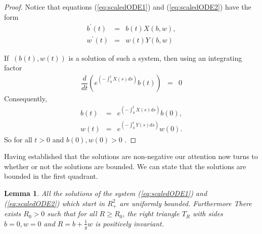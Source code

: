 \documentclass[review,authoryear]{elsarticle}
\newtheorem{lemma}[theorem]{Lemma}
\begin{document}
\begin{proof}
  Notice that equations (\ref{eq:scaledODE1}) and
  (\ref{eq:scaledODE2}) have the form
\begin{eqnarray}
  b^{\prime}\left( t \right) & = & b(t)X\left( b,w\right), \\
  w^{\prime}\left( t \right) & = & w(t)Y\left( b,w\right)
\end{eqnarray}


If $\ \left( b\left( t\right) ,w\left( t\right) \right)
$ is a solution of such a system, then using an integrating factor
\begin{eqnarray}
\dfrac{d}{dt}\left( e^{\left( -\int_{0}^{t}X(s)ds\right) }b(t)\right) & = & 0
\end{eqnarray}
Consequently,
\begin{eqnarray}
b(t) & = & e^{\left( -\int_{0}^{t}X(s)ds\right) }b(0), \\
w(t) & = & e^{\left( -\int_{0}^{t}Y(s)ds\right) }w(0).
\end{eqnarray}
So for all $t>0$ and $b\left( 0\right) ,w\left( 0\right) >0$ .
\end{proof}

Having established that the solutions are non-negative our attention
now turns to whether or not the solutions are bounded. We can state
that the solutions are bounded in the first quadrant.
\begin{lemma} \label{mm}
All the solutions of the system (\ref{eq:scaledODE1}) and (\ref{eq:scaledODE2}) which start in $R_{+}^{2}$ are
uniformly bounded. Furthermore There exists $R_{0}>0$  such that for all $R\geq R_{0}$, the right
triangle $T_{R}$ with sides $b=0, w=0$ and $R=b+\frac{1}{g}w $ is positively invariant.
\end{lemma}
\end{document}
